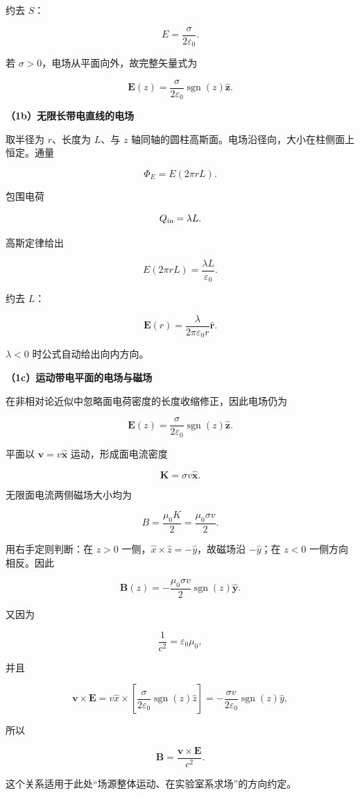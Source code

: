 \documentclass[12pt,a4paper,UTF8]{ctexart}
\begin{document}
约去 \(S\)：

\[E=\frac{\sigma}{2\varepsilon_0}.\]

若 \(\sigma>0\)，电场从平面向外，故完整矢量式为

\[
\boxed{
\bm E(z)=\frac{\sigma}{2\varepsilon_0}\operatorname{sgn}(z)\hat{\bm z}
}.
\]

\textbf{（1b）无限长带电直线的电场}

取半径为 \(r\)、长度为 \(L\)、与 \(z\)
轴同轴的圆柱高斯面。电场沿径向，大小在柱侧面上恒定。通量

\[\Phi_E=E(2\pi rL).\]

包围电荷

\[Q_{\rm in}=\lambda L.\]

高斯定律给出

\[E(2\pi rL)=\frac{\lambda L}{\varepsilon_0}.\]

约去 \(L\)：

\[
\boxed{
\bm E(r)=\frac{\lambda}{2\pi\varepsilon_0r}\hat{\bm r}
}.
\]

\(\lambda<0\) 时公式自动给出向内方向。

\textbf{（1c）运动带电平面的电场与磁场}

在非相对论近似中忽略面电荷密度的长度收缩修正，因此电场仍为

\[
\boxed{
\bm E(z)=\frac{\sigma}{2\varepsilon_0}\operatorname{sgn}(z)\hat{\bm z}
}.
\]

平面以 \(\bm v=v\hat{\bm x}\) 运动，形成面电流密度

\[
\bm K=\sigma v\hat{\bm x}.
\]

无限面电流两侧磁场大小均为

\[B=\frac{\mu_0K}{2}=\frac{\mu_0\sigma v}{2}.\]

用右手定则判断：在 \(z>0\)
一侧，\(\hat x\times\hat z=-\hat y\)，故磁场沿 \(-\hat y\)；在 \(z<0\)
一侧方向相反。因此

\[
\boxed{
\bm B(z)=-\frac{\mu_0\sigma v}{2}\operatorname{sgn}(z)\hat{\bm y}
}.
\]

又因为

\[
\frac1{c^2}=\varepsilon_0\mu_0,
\]

并且

\[
\bm v\times\bm E
=v\hat x\times\left[\frac{\sigma}{2\varepsilon_0}\operatorname{sgn}(z)\hat z\right]
=-\frac{\sigma v}{2\varepsilon_0}\operatorname{sgn}(z)\hat y,
\]

所以

\[
\boxed{
\bm B=\frac{\bm v\times\bm E}{c^2}
}.
\]

这个关系适用于此处``场源整体运动、在实验室系求场''的方向约定。
\end{document}
